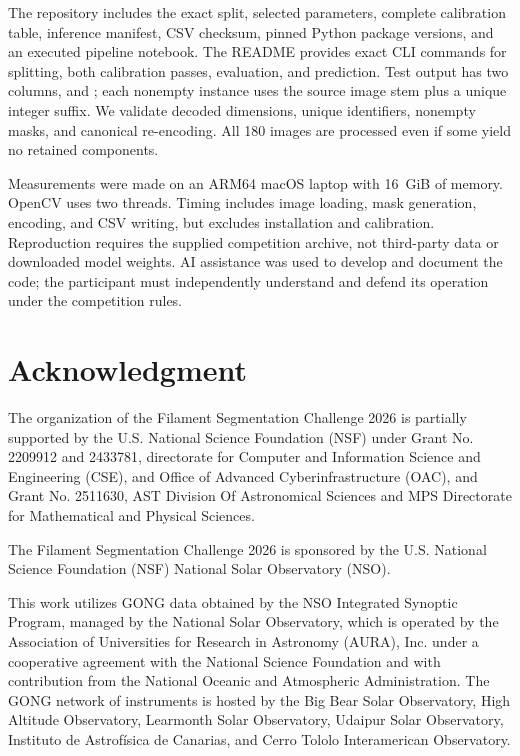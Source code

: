 \documentclass[sigconf]{acmart}
\begin{document}
The repository includes the exact split, selected parameters, complete calibration table, inference manifest, CSV checksum, pinned Python package versions, and an executed pipeline notebook. The README provides exact CLI commands for splitting, both calibration passes, evaluation, and prediction. Test output has two columns,  and ; each nonempty instance uses the source image stem plus a unique integer suffix. We validate decoded dimensions, unique identifiers, nonempty masks, and canonical re-encoding. All 180 images are processed even if some yield no retained components.

Measurements were made on an ARM64 macOS laptop with 16~GiB of memory. OpenCV uses two threads. Timing includes image loading, mask generation, encoding, and CSV writing, but excludes installation and calibration. Reproduction requires the supplied competition archive, not third-party data or downloaded model weights. AI assistance was used to develop and document the code; the participant must independently understand and defend its operation under the competition rules.

\balance
\section{Acknowledgment}\label{sec:acknowledgment}
The organization of the Filament Segmentation Challenge 2026 is partially supported by the U.S. National Science Foundation (NSF) under Grant No. 2209912 and 2433781, directorate for Computer and Information Science and Engineering (CSE), and Office of Advanced Cyberinfrastructure (OAC), and Grant No. 2511630, AST Division Of Astronomical Sciences and MPS Directorate for Mathematical and Physical Sciences.

The Filament Segmentation Challenge 2026 is sponsored by the U.S. National Science Foundation (NSF) National Solar Observatory (NSO).

This work utilizes GONG data obtained by the NSO Integrated Synoptic Program, managed by the National Solar Observatory, which is operated by the Association of Universities for Research in Astronomy (AURA), Inc. under a cooperative agreement with the National Science Foundation and with contribution from the National Oceanic and Atmospheric Administration. The GONG network of instruments is hosted by the Big Bear Solar Observatory, High Altitude Observatory, Learmonth Solar Observatory, Udaipur Solar Observatory, Instituto de Astrofísica de Canarias, and Cerro Tololo Interamerican Observatory.


\end{document}

